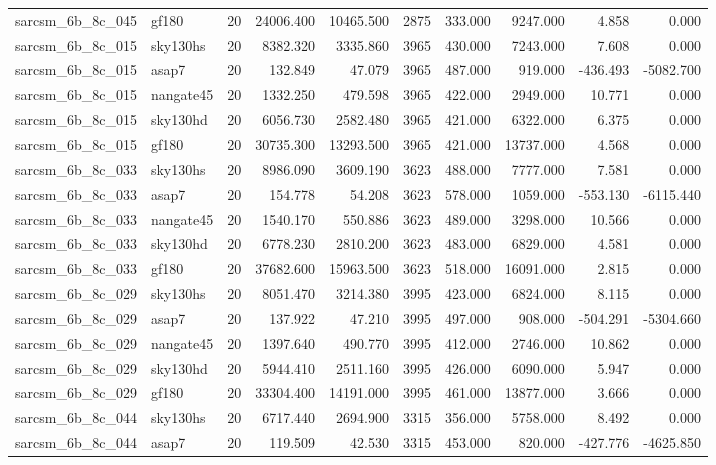 \begin{tabular}{llrrrrrrrr}
sarcsm\_6b\_8c\_045 & gf180 & 20 & 24006.400 & 10465.500 & 2875 & 333.000 & 9247.000 & 4.858 & 0.000 \\
sarcsm\_6b\_8c\_015 & sky130hs & 20 & 8382.320 & 3335.860 & 3965 & 430.000 & 7243.000 & 7.608 & 0.000 \\
sarcsm\_6b\_8c\_015 & asap7 & 20 & 132.849 & 47.079 & 3965 & 487.000 & 919.000 & -436.493 & -5082.700 \\
sarcsm\_6b\_8c\_015 & nangate45 & 20 & 1332.250 & 479.598 & 3965 & 422.000 & 2949.000 & 10.771 & 0.000 \\
sarcsm\_6b\_8c\_015 & sky130hd & 20 & 6056.730 & 2582.480 & 3965 & 421.000 & 6322.000 & 6.375 & 0.000 \\
sarcsm\_6b\_8c\_015 & gf180 & 20 & 30735.300 & 13293.500 & 3965 & 421.000 & 13737.000 & 4.568 & 0.000 \\
sarcsm\_6b\_8c\_033 & sky130hs & 20 & 8986.090 & 3609.190 & 3623 & 488.000 & 7777.000 & 7.581 & 0.000 \\
sarcsm\_6b\_8c\_033 & asap7 & 20 & 154.778 & 54.208 & 3623 & 578.000 & 1059.000 & -553.130 & -6115.440 \\
sarcsm\_6b\_8c\_033 & nangate45 & 20 & 1540.170 & 550.886 & 3623 & 489.000 & 3298.000 & 10.566 & 0.000 \\
sarcsm\_6b\_8c\_033 & sky130hd & 20 & 6778.230 & 2810.200 & 3623 & 483.000 & 6829.000 & 4.581 & 0.000 \\
sarcsm\_6b\_8c\_033 & gf180 & 20 & 37682.600 & 15963.500 & 3623 & 518.000 & 16091.000 & 2.815 & 0.000 \\
sarcsm\_6b\_8c\_029 & sky130hs & 20 & 8051.470 & 3214.380 & 3995 & 423.000 & 6824.000 & 8.115 & 0.000 \\
sarcsm\_6b\_8c\_029 & asap7 & 20 & 137.922 & 47.210 & 3995 & 497.000 & 908.000 & -504.291 & -5304.660 \\
sarcsm\_6b\_8c\_029 & nangate45 & 20 & 1397.640 & 490.770 & 3995 & 412.000 & 2746.000 & 10.862 & 0.000 \\
sarcsm\_6b\_8c\_029 & sky130hd & 20 & 5944.410 & 2511.160 & 3995 & 426.000 & 6090.000 & 5.947 & 0.000 \\
sarcsm\_6b\_8c\_029 & gf180 & 20 & 33304.400 & 14191.000 & 3995 & 461.000 & 13877.000 & 3.666 & 0.000 \\
sarcsm\_6b\_8c\_044 & sky130hs & 20 & 6717.440 & 2694.900 & 3315 & 356.000 & 5758.000 & 8.492 & 0.000 \\
sarcsm\_6b\_8c\_044 & asap7 & 20 & 119.509 & 42.530 & 3315 & 453.000 & 820.000 & -427.776 & -4625.850 \\

\end{tabular}
